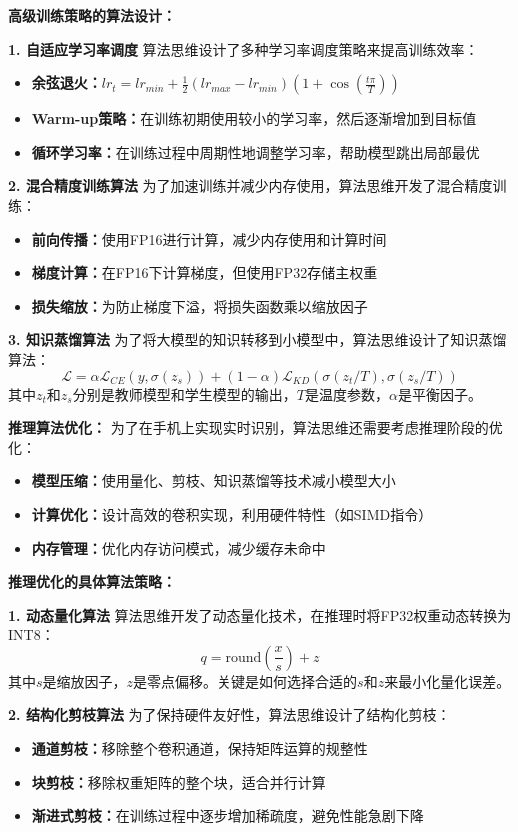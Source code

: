 \textbf{高级训练策略的算法设计：}

\textbf{1. 自适应学习率调度}
算法思维设计了多种学习率调度策略来提高训练效率：
\begin{itemize}
\item \textbf{余弦退火：}$lr_t = lr_{min} + \frac{1}{2}(lr_{max} - lr_{min})(1 + \cos(\frac{t\pi}{T}))$
\item \textbf{Warm-up策略：}在训练初期使用较小的学习率，然后逐渐增加到目标值
\item \textbf{循环学习率：}在训练过程中周期性地调整学习率，帮助模型跳出局部最优
\end{itemize}

\textbf{2. 混合精度训练算法}
为了加速训练并减少内存使用，算法思维开发了混合精度训练：
\begin{itemize}
\item \textbf{前向传播：}使用FP16进行计算，减少内存使用和计算时间
\item \textbf{梯度计算：}在FP16下计算梯度，但使用FP32存储主权重
\item \textbf{损失缩放：}为防止梯度下溢，将损失函数乘以缩放因子
\end{itemize}

\textbf{3. 知识蒸馏算法}
为了将大模型的知识转移到小模型中，算法思维设计了知识蒸馏算法：
$$\mathcal{L} = \alpha \mathcal{L}_{CE}(y, \sigma(z_s)) + (1-\alpha) \mathcal{L}_{KD}(\sigma(z_t/T), \sigma(z_s/T))$$
其中$z_t$和$z_s$分别是教师模型和学生模型的输出，$T$是温度参数，$\alpha$是平衡因子。

\textbf{推理算法优化：}
为了在手机上实现实时识别，算法思维还需要考虑推理阶段的优化：
\begin{itemize}
\item \textbf{模型压缩：}使用量化、剪枝、知识蒸馏等技术减小模型大小
\item \textbf{计算优化：}设计高效的卷积实现，利用硬件特性（如SIMD指令）
\item \textbf{内存管理：}优化内存访问模式，减少缓存未命中
\end{itemize}

\textbf{推理优化的具体算法策略：}

\textbf{1. 动态量化算法}
算法思维开发了动态量化技术，在推理时将FP32权重动态转换为INT8：
$$q = \text{round}(\frac{x}{s}) + z$$
其中$s$是缩放因子，$z$是零点偏移。关键是如何选择合适的$s$和$z$来最小化量化误差。

\textbf{2. 结构化剪枝算法}
为了保持硬件友好性，算法思维设计了结构化剪枝：
\begin{itemize}
\item \textbf{通道剪枝：}移除整个卷积通道，保持矩阵运算的规整性
\item \textbf{块剪枝：}移除权重矩阵的整个块，适合并行计算
\item \textbf{渐进式剪枝：}在训练过程中逐步增加稀疏度，避免性能急剧下降
\end{itemize}

